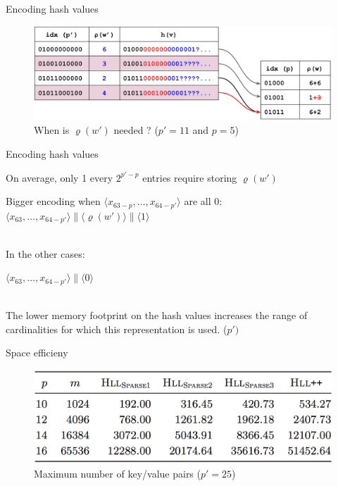 \documentclass{beamer}
\begin{document}
\begin{frame}{Encoding hash values}
  \begin{figure}[c]
    \includegraphics[scale=0.4]{encoding_hash.png}
    \caption{When is $\varrho(w\prime)$ needed ? ($p' = 11$ and $p = 5$)}
  \end{figure}
\end{frame}

\begin{frame}{Encoding hash values}

  On average, only 1 every $2^{p\prime - p} $ entries require storing $\varrho(w\prime)$

  Bigger encoding when $\langle x_{63-p}, \dots, x_{64-p\prime} \rangle$ are all 0:
  ~\\
  \colorbox{light-gray}{$\langle x_{63}, \dots, x_{64-p\prime} \rangle \| \langle \varrho (w\prime) \rangle \| \langle 1 \rangle $}

  ~\\
  In the other cases:

  \colorbox{light-gray}{$\langle x_{63}, \dots, x_{64-p\prime} \rangle \| \langle 0 \rangle $}

  ~\\
  The lower memory footprint on the hash values increases the range of cardinalities for which this representation is used. ($p\prime)$

\end{frame}



\begin{frame}{Space efficieny}
  
  \begin{figure}[c]
    \includegraphics [scale=0.45]  {sparse_all.png}
    \caption{Maximum number of key/value pairs ($p' = 25$)}
  \end{figure}
\end{frame}
\end{document}
